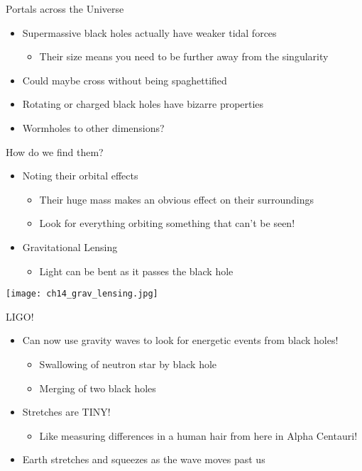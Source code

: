 \documentclass[pdf,aspectratio=169]{beamer}
\begin{document}
\begin{frame}{Portals across the Universe}
  \begin{itemize}
	\item Supermassive black holes actually have weaker tidal forces
	  \begin{itemize}
		\item Their size means you need to be further away from the singularity
	  \end{itemize}
	\item Could maybe cross without being spaghettified
	\item Rotating or charged black holes have bizarre properties
	\item Wormholes to other dimensions?
  \end{itemize}
\end{frame}

\begin{frame}{How do we find them?}

  \begin{itemize}
	\item Noting their orbital effects
	  \begin{itemize}
		\item Their huge mass makes an obvious effect on their surroundings
		\item Look for everything orbiting something that can't be seen!
	  \end{itemize}
	\item Gravitational Lensing
	  \begin{itemize}
		\item Light can be bent as it passes the black hole
	  \end{itemize}
  \end{itemize}
  \begin{center}
	\texttt{[image: ch14\_grav\_lensing.jpg]}
  \end{center}
\end{frame}

\begin{frame}{LIGO!}
	\begin{itemize}
		\item Can now use gravity waves to look for energetic events from black holes!
			\begin{itemize}
				\item Swallowing of neutron star by black hole
				\item Merging of two black holes
			\end{itemize}
		\item Stretches are TINY!
			\begin{itemize}
				\item Like measuring differences in a human hair from here in Alpha Centauri!
			\end{itemize}
		\item Earth stretches and squeezes as the wave moves past us
	\end{itemize}
\end{frame}
\end{document}
